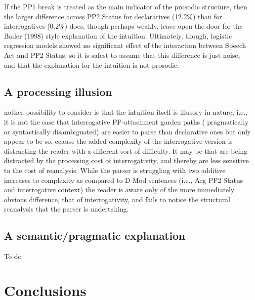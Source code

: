 \documentclass[12pt,oneside]{book}
\begin{document}
If the PP1 break is treated as the main indicator of the prosodic structure, then the larger difference across PP2 Status for declaratives (12.2\%) than for interrogatives (0.2\%) does, though perhaps weakly, leave open the door for the Bader (1998) style explanation of the intuition. Ultimately, though, logistic regression models showed no significant effect of the interaction between Speech Act and PP2 Status, so it is safest to assume that this difference is just noise, and that the explanation for the intuition is not prosodic.

\hypertarget{a-processing-illusion}{%
\subsection{A processing illusion}\label{a-processing-illusion}}

 nother possibility to consider is that the intuition itself is illusory in nature, i.e., it is not the case that interrogative PP-attachment garden paths ( pragmatically or syntactically disambiguated) are easier to parse than declarative ones\added{,} but only appear to be so. ecause the added complexity of the interrogative version is distracting the reader with a different sort of difficulty. It may be that  are being distracted by the processing cost of interrogativity, and thereby are less sensitive to the cost of reanalysis. While the parser is struggling with two additive increases to complexity as compared to D Mod sentences (i.e., Arg PP2 Status and interrogative context) the reader is aware only of the more immediately obvious difference, that of interrogativity, and fails to  notice the structural reanalysis that the parser is undertaking.

\hypertarget{a-semanticpragmatic-explanation}{%
\subsection{A semantic/pragmatic explanation}\label{a-semanticpragmatic-explanation}}

To do

\hypertarget{confound}{%
\section{Conclusions}\label{confound}}
\end{document}
